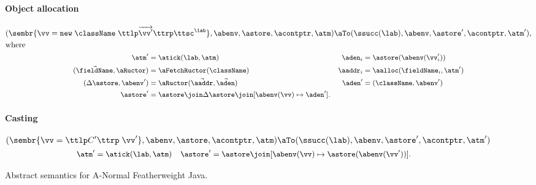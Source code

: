 \begin{figure}
\paragraph{Object allocation}
\begin{gather*}
\begin{split}
  &(
  \sembr{
    \vv = 
    {\tt new}\; \className\; \ttlp
    \overrightarrow{\vv'}
  \ttrp\ttsc^\lab},
  \abenv,
  \astore,
  \acontptr,
  \atm
  )
  \aTo
  (
  \ssucc(\lab),
  \abenv,
  \astore',
  \acontptr,
  \atm'
  )\text{,}\\
  &\text{where }
\end{split}\\
\begin{small}\begin{align*}
  \atm' &= \atick(\lab,\atm)
  &
  \aden_i &= \astore(\abenv(\vv_i'))
  \\
  (\vec{\fieldName},\aRuctor) &=
   \aFetchRuctor(\className)
  &
  \aaddr_i &= \aalloc(\fieldName_i,\atm')
  \\
  (\Delta \astore, \abenv') &= 
   \aRuctor(\vec{\aaddr}, \vec{\aden})
  &
  \aden' &= (\className, \abenv')
  \\
  \astore' &= \astore \join \Delta \astore \join [\abenv(\vv) \mapsto \aden']
  \text.
\end{align*}\end{small}\end{gather*}



\paragraph{Casting}
\begin{gather*}
  (
  \sembr{\vv = \ttlp C'\ttrp\; \vv'},
  \abenv,
  \astore,
  \acontptr,
  \atm
  )
  \aTo
  (
  \ssucc(\lab),
  \abenv,
  \astore',
  \acontptr,
  \atm'
  )
  \\
\begin{small}\begin{align*}
  \atm' &= \atick(\lab, \atm)
  &
  \astore' &= \astore \join [\abenv(\vv) \mapsto \astore(\abenv(\vv'))]
  \text.
\end{align*}\end{small}\end{gather*}
\caption{Abstract semantics for A-Normal Featherweight Java.}
\label{fig:abstract-anfw-java}
\end{figure}







